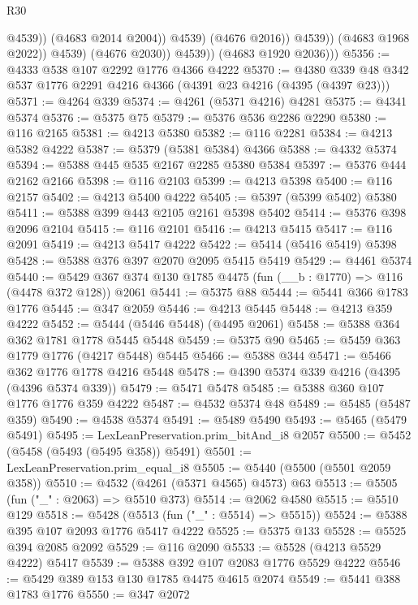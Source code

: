 \begin{lexlean}{R30}
\begin{coremodule}
{{{{{                                @4539))
                            (@4683 @2014 @2004))
                          @4539)
                        (@4676 @2016))
                      @4539))
                  (@4683 @1968 @2022))
                @4539)
              (@4676 @2030))
            @4539))
        (@4683 @1920 @2036)))
@5356 := @4333 @538 @107 @2292 @1776 @4366 @4222
@5370 := @4380 @339 @48 @342 @537 @1776 @2291 @4216 @4366 (@4391 @23 @4216 (@4395 (@4397 @23)))
@5371 := @4264 @339
@5374 := @4261 (@5371 @4216) @4281
@5375 := @4341 @5374
@5376 := @5375 @75
@5379 := @5376 @536 @2286 @2290
@5380 := @116 @2165
@5381 := @4213 @5380
@5382 := @116 @2281
@5384 := @4213 @5382 @4222
@5387 := @5379 (@5381 @5384) @4366
@5388 := @4332 @5374
@5394 := @5388 @445 @535 @2167 @2285 @5380 @5384
@5397 := @5376 @444 @2162 @2166
@5398 := @116 @2103
@5399 := @4213 @5398
@5400 := @116 @2157
@5402 := @4213 @5400 @4222
@5405 := @5397 (@5399 @5402) @5380
@5411 := @5388 @399 @443 @2105 @2161 @5398 @5402
@5414 := @5376 @398 @2096 @2104
@5415 := @116 @2101
@5416 := @4213 @5415
@5417 := @116 @2091
@5419 := @4213 @5417 @4222
@5422 := @5414 (@5416 @5419) @5398
@5428 := @5388 @376 @397 @2070 @2095 @5415 @5419
@5429 := @4461 @5374
@5440 := @5429 @367 @374 @130 @1785 @4475 (fun (__b : @1770) => @116 (@4478 @372 @128)) @2061
@5441 := @5375 @88
@5444 := @5441 @366 @1783 @1776
@5445 := @347 @2059
@5446 := @4213 @5445
@5448 := @4213 @359 @4222
@5452 := @5444 (@5446 @5448) (@4495 @2061)
@5458 := @5388 @364 @362 @1781 @1778 @5445 @5448
@5459 := @5375 @90
@5465 := @5459 @363 @1779 @1776 (@4217 @5448) @5445
@5466 := @5388 @344
@5471 := @5466 @362 @1776 @1778 @4216 @5448
@5478 := @4390 @5374 @339 @4216 (@4395 (@4396 @5374 @339))
@5479 := @5471 @5478
@5485 := @5388 @360 @107 @1776 @1776 @359 @4222
@5487 := @4532 @5374 @48
@5489 := @5485 (@5487 @359)
@5490 := @4538 @5374
@5491 := @5489 @5490
@5493 := @5465 (@5479 @5491)
@5495 := LexLeanPreservation.prim_bitAnd_i8 @2057
@5500 := @5452 (@5458 (@5493 (@5495 @358)) @5491)
@5501 := LexLeanPreservation.prim_equal_i8
@5505 := @5440 (@5500 (@5501 @2059 @358))
@5510 := @4532 (@4261 (@5371 @4565) @4573) @63
@5513 := @5505 (fun ("_" : @2063) => @5510 @373)
@5514 := @2062 @4580
@5515 := @5510 @129
@5518 := @5428 (@5513 (fun ("_" : @5514) => @5515))
@5524 := @5388 @395 @107 @2093 @1776 @5417 @4222
@5525 := @5375 @133
@5528 := @5525 @394 @2085 @2092
@5529 := @116 @2090
@5533 := @5528 (@4213 @5529 @4222) @5417
@5539 := @5388 @392 @107 @2083 @1776 @5529 @4222
@5546 := @5429 @389 @153 @130 @1785 @4475 @4615 @2074
@5549 := @5441 @388 @1783 @1776
@5550 := @347 @2072
}}}}}
\end{coremodule}
\end{lexlean}
